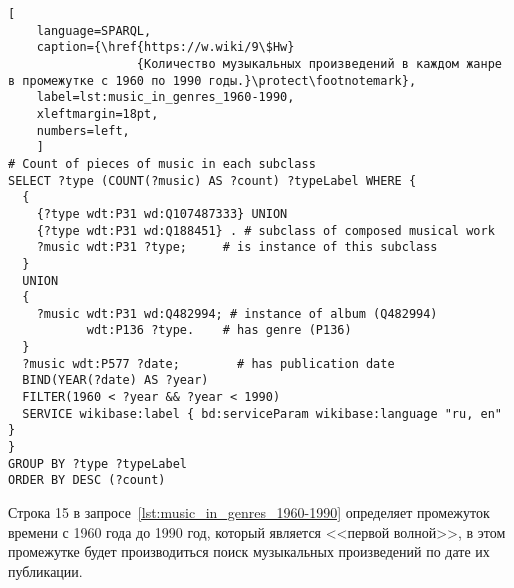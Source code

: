 \begin{lstlisting}[ 
    language=SPARQL,
    caption={\href{https://w.wiki/9\$Hw}
                  {Количество музыкальных произведений в каждом жанре в промежутке с 1960 по 1990 годы.}\protect\footnotemark},
    label=lst:music_in_genres_1960-1990,
    xleftmargin=18pt,
    numbers=left,
    ]
# Count of pieces of music in each subclass
SELECT ?type (COUNT(?music) AS ?count) ?typeLabel WHERE {
  {
    {?type wdt:P31 wd:Q107487333} UNION 
    {?type wdt:P31 wd:Q188451} . # subclass of composed musical work
    ?music wdt:P31 ?type;     # is instance of this subclass
  }
  UNION
  {
    ?music wdt:P31 wd:Q482994; # instance of album (Q482994)
           wdt:P136 ?type.    # has genre (P136)
  }
  ?music wdt:P577 ?date;        # has publication date
  BIND(YEAR(?date) AS ?year)
  FILTER(1960 < ?year && ?year < 1990)
  SERVICE wikibase:label { bd:serviceParam wikibase:language "ru, en" }
}
GROUP BY ?type ?typeLabel
ORDER BY DESC (?count)
\end{lstlisting}%

Строка 15 в запросе~\ref{lst:music_in_genres_1960-1990} определяет промежуток времени с 1960 года до 1990 год, который является <<первой волной>>, в этом промежутке будет производиться поиск музыкальных произведений по дате их публикации.





